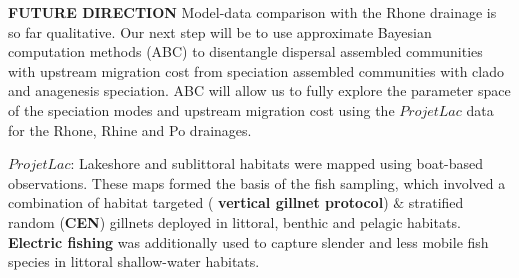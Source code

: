 \documentclass[10pt,landscape,final,a0paper,fontscale=0.285]{baposter}
\begin{document}
\begin{poster}
%    
{
  \vspace{2em} {\bf FUTURE DIRECTION} Model-data comparison with the
  Rhone drainage is so far qualitative. Our next step will be to use
  approximate Bayesian computation methods (ABC) to disentangle
  dispersal assembled communities with upstream migration cost from
  speciation assembled communities with clado and anagenesis
  speciation. ABC will allow us to fully explore the parameter space
  of the speciation modes and upstream migration cost using the
  $ProjetLac$ data for the Rhone, Rhine and Po drainages.
   \vspace{0.3em}
  }

{
  \indent $ProjetLac$: Lakeshore and sublittoral habitats were mapped using
  boat-based observations. These maps formed the basis of the fish
  sampling, which involved a combination of habitat targeted ({\bf
    vertical gillnet protocol}) $\&$ stratified random ({\bf CEN})
  gillnets deployed in littoral, benthic and pelagic habitats. {\bf
    Electric fishing} was additionally used to capture slender and
  less mobile fish species in littoral shallow-water habitats.
  \vspace{0.3em} }

\end{poster}
\end{document}
